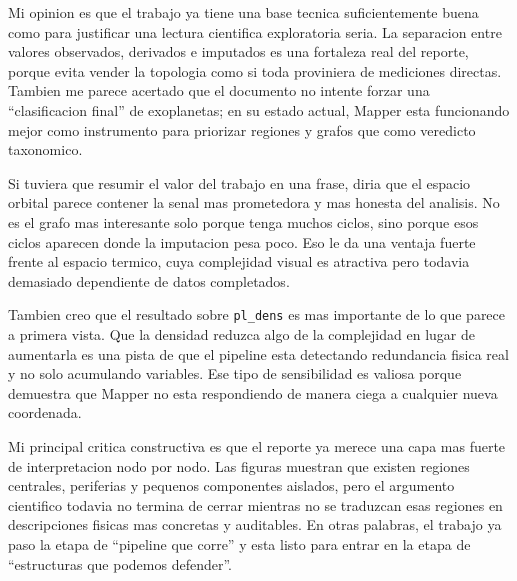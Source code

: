 Mi opinion es que el trabajo ya tiene una base tecnica suficientemente buena como para justificar una lectura cientifica exploratoria seria. La separacion entre valores observados, derivados e imputados es una fortaleza real del reporte, porque evita vender la topologia como si toda proviniera de mediciones directas. Tambien me parece acertado que el documento no intente forzar una ``clasificacion final'' de exoplanetas; en su estado actual, Mapper esta funcionando mejor como instrumento para priorizar regiones y grafos que como veredicto taxonomico.

Si tuviera que resumir el valor del trabajo en una frase, diria que el espacio orbital parece contener la senal mas prometedora y mas honesta del analisis. No es el grafo mas interesante solo porque tenga muchos ciclos, sino porque esos ciclos aparecen donde la imputacion pesa poco. Eso le da una ventaja fuerte frente al espacio termico, cuya complejidad visual es atractiva pero todavia demasiado dependiente de datos completados.

Tambien creo que el resultado sobre \texttt{pl\_dens} es mas importante de lo que parece a primera vista. Que la densidad reduzca algo de la complejidad en lugar de aumentarla es una pista de que el pipeline esta detectando redundancia fisica real y no solo acumulando variables. Ese tipo de sensibilidad es valiosa porque demuestra que Mapper no esta respondiendo de manera ciega a cualquier nueva coordenada.

Mi principal critica constructiva es que el reporte ya merece una capa mas fuerte de interpretacion nodo por nodo. Las figuras muestran que existen regiones centrales, periferias y pequenos componentes aislados, pero el argumento cientifico todavia no termina de cerrar mientras no se traduzcan esas regiones en descripciones fisicas mas concretas y auditables. En otras palabras, el trabajo ya paso la etapa de ``pipeline que corre'' y esta listo para entrar en la etapa de ``estructuras que podemos defender''.
